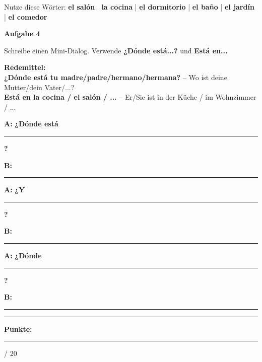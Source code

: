 \documentclass[11pt, a4paper]{article}
\newcommand{\fachfarbe}{spanisch}
\newcommand{\maxpunkte}{20}
\newcommand{\punktebox}[1]{\hfill\fbox{\small \_/#1}}
\newcommand{\luecke}[1]{\rule{#1}{0.4pt}}
\newenvironment{aufgabe}[1]{%
    \needspace{5\baselineskip}%
    \nopagebreak[4]%
    \vspace{10pt}
    \noindent\textbf{\textcolor{\fachfarbe}{Aufgabe #1}}
    \nopagebreak[4]%
    \vspace{5pt}
    \nopagebreak[4]%
    \begin{list}{}{\leftmargin=0pt}
    \item[]
}{%
    \end{list}
}
\newcommand{\es}[1]{\textcolor{\fachfarbe}{\textbf{#1}}}
\begin{document}
\begin{hinweis}
Nutze diese Wörter: \es{el salón} | \es{la cocina} | \es{el dormitorio} | \es{el baño} | \es{el jardín} | \es{el comedor}
\end{hinweis}

\vspace{10pt}


\begin{aufgabe}{4}
Schreibe einen Mini-Dialog. Verwende \es{¿Dónde está...?} und \es{Está en...} \punktebox{6}
\end{aufgabe}

\begin{vokabelkasten}
\textbf{Redemittel:}\\
\es{¿Dónde está tu madre/padre/hermano/hermana?} -- Wo ist deine Mutter/dein Vater/...?\\
\es{Está en la cocina / el salón / ...} -- Er/Sie ist in der Küche / im Wohnzimmer / ...
\end{vokabelkasten}

\vspace{0.8em}

\noindent
\textbf{A:} \es{¿Dónde está} \luecke{5cm}\es{?}

\vspace{0.8em}

\noindent
\textbf{B:} \luecke{10cm}

\vspace{1em}

\noindent
\textbf{A:} \es{¿Y} \luecke{5cm}\es{?}

\vspace{0.8em}

\noindent
\textbf{B:} \luecke{10cm}

\vspace{1em}

\noindent
\textbf{A:} \es{¿Dónde} \luecke{5cm}\es{?}

\vspace{0.8em}

\noindent
\textbf{B:} \luecke{10cm}


\vspace{20pt}
\hrule
\vspace{10pt}

\begin{flushright}
\textbf{Punkte:} \luecke{1cm} / \maxpunkte
\end{flushright}
\end{document}

